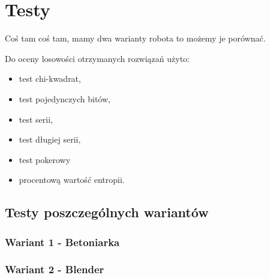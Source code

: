 \chapter{Testy}

Coś tam coś tam, mamy dwa warianty robota to możemy je porównać.

Do oceny losowości otrzymanych rozwiązań użyto:
\begin{itemize}
    \item test chi-kwadrat,
    \item test pojedynczych bitów,
    \item test serii,
    \item test długiej serii,
    \item test pokerowy
    \item procentową wartość entropii.
\end{itemize}

\section{Testy poszczególnych wariantów}
\subsection{Wariant 1 - \glqq Betoniarka\grqq}
\subsection{Wariant 2 - \glqq Blender\grqq}

